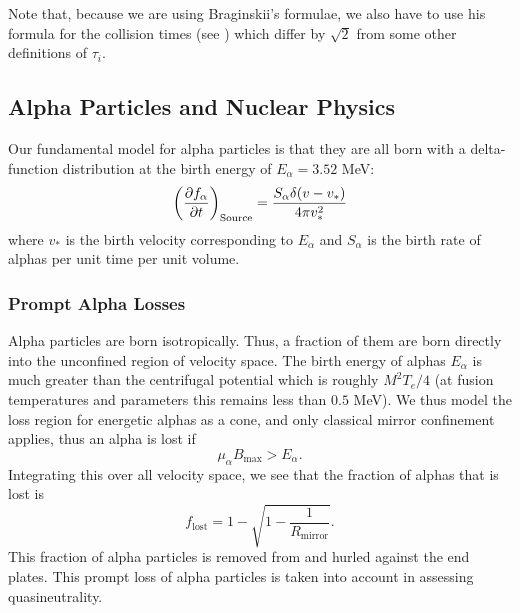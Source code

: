 \documentclass{revtex4}
\begin{document}
Note that, because we are using Braginskii's formulae, we also have to use his formula for the collision times (see \citet{braginskii1965tpp}) which differ by $\sqrt{2}$ from some other definitions of $\tau_i$.

\subsection{Alpha Particles and Nuclear Physics}
Our fundamental model for alpha particles is that they are all born with a delta-function distribution at the birth energy of $E_\alpha = 3.52$ MeV:
\begin{equation}
\left(  \frac{\partial f_\alpha} {\partial t} \right)_{\mathrm{Source}} = \frac{S_\alpha \delta(v-v_*)}{4\pi v_*^2}
\end{equation}
where $v_*$ is the birth velocity corresponding to $E_\alpha$ and $S_\alpha$ is the birth rate of alphas per unit time per unit volume.

\subsubsection{Prompt Alpha Losses}
Alpha particles are born isotropically. Thus, a fraction of them are born directly into the unconfined region of velocity space.
The birth energy of alphas $E_\alpha$ is much greater than the centrifugal potential which is roughly $M^2 T_e / 4$ (at fusion temperatures and parameters this remains
less than $0.5$ MeV). We thus model the loss region for energetic alphas as a cone, and only classical mirror confinement applies, thus an alpha is lost if
\begin{equation}
\mu_\alpha B_{\mathrm{max}} > E_\alpha.
\end{equation}
Integrating this over all velocity space, we see that the fraction of alphas that is lost is
\begin{equation}
f_{\mathrm{lost}} = 1 - \sqrt{1 - \frac{1}{R_{\mathrm{mirror}}}}.
\end{equation}
This fraction of alpha particles is removed from \mctrans{} and hurled against the end plates.
This prompt loss of alpha particles is taken into account in assessing quasineutrality.
\end{document}
